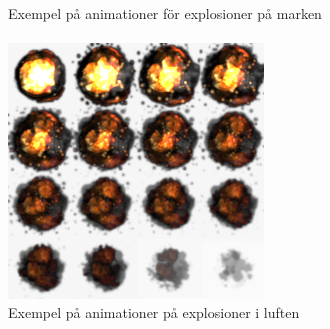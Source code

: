 \documentclass{TDP003mall}
\begin{document}
\\ Exempel på animationer för explosioner på marken \\\\
\includegraphics*[scale=0.4]{1.png}
\\ Exempel på animationer på explosioner i luften \\\\
\end{document}
